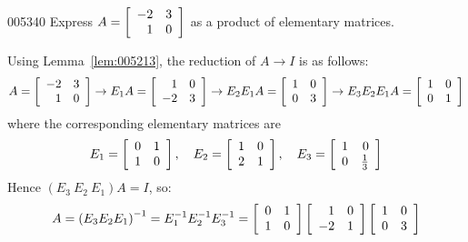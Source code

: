 \begin{example}{}{005340}
Express $A = \left[ \begin{array}{rr}
-2 & 3 \\
1 & 0
\end{array} \right]$
 as a product of elementary matrices.

\begin{solution}
  Using Lemma~\ref{lem:005213}, the reduction of $A \to I$ is as follows:
\begin{equation*}
A = \left[ \begin{array}{rr}
-2 & 3 \\
1 & 0
\end{array} \right] \rightarrow 
E_{1}A = \left[ \begin{array}{rr}
1 & 0 \\
-2 & 3
\end{array} \right] \rightarrow
E_{2}E_{1}A = \left[ \begin{array}{rr}
1 & 0 \\
0 & 3
\end{array} \right] \rightarrow
E_{3}E_{2}E_{1}A = \left[ \begin{array}{rr}
1 & 0 \\
0 & 1
\end{array} \right]
\end{equation*}
where the corresponding elementary matrices are
\begin{equation*}
E_{1} = \left[ \begin{array}{rr}
0 & 1 \\
1 & 0
\end{array} \right], \quad
E_{2} = \left[ \begin{array}{rr}
1 & 0 \\
2 & 1
\end{array} \right], \quad
E_{3} = \left[ \begin{array}{rr}
1 & 0 \\
0 & \tfrac{1}{3}
\end{array} \right]
\end{equation*}
Hence $(E_{3}\ E_{2}\ E_{1})A = I$, so:
\begin{equation*}
A = \left(E_{3}E_{2}E_{1}\right)^{-1} = E_{1}^{-1}E_{2}^{-1}E_{3}^{-1} = \left[ \begin{array}{rr}
0 & 1 \\
1 & 0
\end{array} \right] \left[ \begin{array}{rr}
1 & 0 \\
-2 & 1
\end{array} \right] \left[ \begin{array}{rr}
1 & 0 \\
0 & 3
\end{array} \right]
\end{equation*}
\end{solution}
\end{example}

